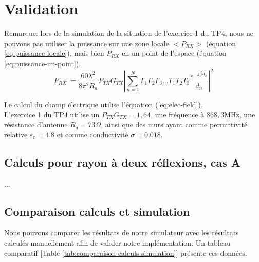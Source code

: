 \chapter{Validation}
\label{chapter-3}





Remarque: lors de la simulation de la situation de l'exercice 1 du TP4, nous ne pouvons pas utiliser la puissance sur une zone locale $<P_{RX}>$ (équation \ref{eq:puissance-locale}), mais bien $P_{RX}$ en un point de l'espace (équation \ref{eq:puissance-un-point}).
\begin{equation}
    \label{eq:puissance-un-point}
    P_{RX}\ = \frac{60 \lambda^2}{8 \pi^2 R_a}P_{TX}G_{TX} \left| \sum_{n=1}^N \Gamma_1 \Gamma_2 \Gamma_3 \dotsc T_1 T_2 T_3 \frac{e^{-j \beta d_n}}{d_n} \right|^2
\end{equation}

Le calcul du champ électrique utilise l'équation (\ref{eq:elec-field}).\\

L'exercice 1 du TP4 utilise un $P_{TX}G_{TX}=1,64$, une fréquence à $868,3 \mathrm{MHz}$, une résistance d'antenne $R_a=73 \Omega$, ainsi que des murs ayant comme permittivité relative $\varepsilon_r=4.8$ et comme conductivité $\sigma=0.018$.

\section{Calculs pour rayon à deux réflexions, cas A}
...

\section{Comparaison calculs et simulation}
Nous pouvons comparer les résultats de notre simulateur avec les résultats calculés manuellement afin de valider notre implémentation. Un tableau comparatif [Table \ref{tab:comparaison-calculs-simulation}] présente ces données.

